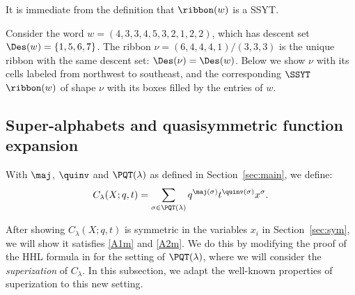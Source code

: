 It is immediate from the definition that $\ribbon(w)$ is a SSYT. 


\begin{example}
Consider the word $w=(4,3,3,4,5,3,2,1,2,2)$, which has descent set $\Des(w)= \{1,5,6,7\}$. The ribbon $\nu=(6,4,4,4,1)/(3,3,3)$ is the unique ribbon with the same descent set: $\Des(\nu)=\Des(w)$. Below we show $\nu$ with its cells labeled from northwest to southeast, and the corresponding $\SSYT$ $\ribbon(w)$ of shape $\nu$ with its boxes filled by the entries of $w$. 


\begin{center}
\end{center}

\end{example}



\subsection{Super-alphabets and quasisymmetric function expansion}\label{sec:superization}

With $\maj$, $\quinv$  and $\PQT(\lambda)$ as defined in Section~\ref{sec:main}, we define:
\begin{equation}\label{eq:C}
C_{\lambda}(X;q,t) = \sum_{\sigma\in \PQT(\lambda)} q^{\maj(\sigma)} t^{\quinv(\sigma)}x^{\sigma}.
\end{equation} 

After showing $C_{\lambda}(X;q,t)$ is symmetric in the variables $x_i$ in Section~\ref{sec:sym}, we will show it satisfies \eqref{A1m} and \eqref{A2m}. We do this by modifying the proof of the HHL formula in \cite[Section 4]{HHL05} for the setting of $\PQT(\lambda)$, where we will consider the \emph{superization} of $C_{\lambda}$. In this subsection, we adapt the well-known properties of superization to this new setting.

